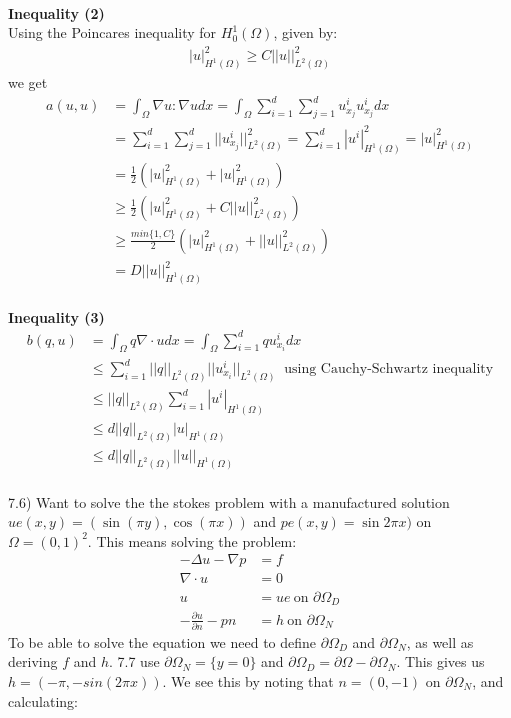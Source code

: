 \documentclass[11pt,a4paper]{report}
\begin{document}
\\
\textbf{Inequality (2)}
\\
Using the Poincares inequality for $H_0^1(\Omega)$, given by: 
\begin{align*}
|u|_{H^1(\Omega)}^2\geq C||u||_{L^2(\Omega)}^2
\end{align*} 
we get 
\begin{align*}
a(u,u)&= \int_{\Omega}\nabla u : \nabla u dx=\int_{\Omega}\sum_{i=1}^d\sum_{j=1}^d u_{x_j}^iu_{x_j}^idx \\
&=\sum_{i=1}^d\sum_{j=1}^d ||u_{x_j}^i||_{L^2(\Omega)}^2=\sum_{i=1}^d |u^i|_{H^1(\Omega)}^2 = |u|_{H^1(\Omega)}^2 \\
&= \frac{1}{2}(|u|_{H^1(\Omega)}^2+|u|_{H^1(\Omega)}^2) \\
&\geq \frac{1}{2}(|u|_{H^1(\Omega)}^2+C||u||_{L^2(\Omega)}^2) \\
&\geq \frac{min\{1,C\}}{2}(|u|_{H^1(\Omega)}^2+||u||_{L^2(\Omega)}^2) \\
&= D||u||_{H^1(\Omega)}^2
\end{align*}
\\
\textbf{Inequality (3)}
\\
\begin{align*}
b(q,u)&=\int_{\Omega} q\nabla \cdot u dx=\int_{\Omega}\sum_{i=1}^d qu_{x_i}^i dx \\
&\leq \sum_{i=1}^d ||q||_{L^2(\Omega)} ||u_{x_i}^i||_{L^2(\Omega)} \ \text{  using Cauchy-Schwartz inequality}  \\
&\leq ||q||_{L^2(\Omega)}\sum_{i=1}^d |u^i|_{H^1(\Omega)} \\
&\leq d||q||_{L^2(\Omega)}|u|_{H^1(\Omega)} \\
&\leq d||q||_{L^2(\Omega)}||u||_{H^1(\Omega)}
\end{align*}
\\
7.6) Want to solve the the stokes problem with a manufactured solution $ue(x,y)=(\sin(\pi y),\cos(\pi x))$ and $pe(x,y)=\sin2\pi x)$ on $\Omega = (0,1)^2$. This means solving the problem:
\begin{align*}
-\Delta u - \nabla p &= f \\
\nabla \cdot u &= 0 \\
u &= ue \ \text{on } \partial\Omega_D \\
-\frac{\partial u}{\partial n} - pn &= h \ \text{on } \partial\Omega_N
\end{align*} 
To be able to solve the equation we need to define $\partial\Omega_D$ and $\partial\Omega_N$, as well as deriving $f$ and $h$. 7.7 use $\partial\Omega_N= \{y=0\}$ and $\partial\Omega_D=\partial\Omega - \partial\Omega_N$. This gives us $h=(-\pi,-sin(2\pi x))$. We see this by noting that $n=(0,-1)$ on $\partial\Omega_N$, and calculating:
\end{document}
